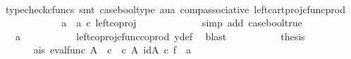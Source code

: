 \begin{isabellebody}
\ \ \ \ \ \ \ \ \ \isamarkupfalse%
\ {\isacharparenleft}{\kern0pt}typecheck{\isacharunderscore}{\kern0pt}cfuncs{\isacharcomma}{\kern0pt}\ smt\ case{\isacharunderscore}{\kern0pt}bool{\isacharunderscore}{\kern0pt}type\ aua\ comp{\isacharunderscore}{\kern0pt}associative{}\ left{\isacharunderscore}{\kern0pt}cart{\isacharunderscore}{\kern0pt}proj{\isacharunderscore}{\kern0pt}cfunc{\isacharunderscore}{\kern0pt}prod{\isacharparenright}{\kern0pt}\isanewline
\ \ \ \ \ \ \ \isamarkupfalse%
\ \isamarkupfalse%
\ {\isachardoublequoteopen}{\isachardot}{\kern0pt}{\isachardot}{\kern0pt}{\isachardot}{\kern0pt}\ {\isacharequal}{\kern0pt}\ {\isacharparenleft}{\kern0pt}a{}\ {\isasymamalg}\ a{}{\isacharparenright}{\kern0pt}\ {\isasymcirc}\isactrlsub c\ left{\isacharunderscore}{\kern0pt}coproj\ {\isasymone}\ {\isasymone}{\isachardoublequoteclose}\isanewline
\ \ \ \ \ \ \ \ \ \isamarkupfalse%
\ {\isacharparenleft}{\kern0pt}simp\ add{\isacharcolon}{\kern0pt}\ case{\isacharunderscore}{\kern0pt}bool{\isacharunderscore}{\kern0pt}true{\isacharparenright}{\kern0pt}\isanewline
\ \ \ \ \ \ \ \isamarkupfalse%
\ \isamarkupfalse%
\ {\isachardoublequoteopen}{\isachardot}{\kern0pt}{\isachardot}{\kern0pt}{\isachardot}{\kern0pt}\ {\isacharequal}{\kern0pt}\ a{}{\isachardoublequoteclose}\isanewline
\ \ \ \ \ \ \ \ \ \isamarkupfalse%
\ left{\isacharunderscore}{\kern0pt}coproj{\isacharunderscore}{\kern0pt}cfunc{\isacharunderscore}{\kern0pt}coprod\ y{\isacharunderscore}{\kern0pt}def\ \isamarkupfalse%
\ blast\isanewline
\ \ \ \ \ \ \ \isamarkupfalse%
\ \isamarkupfalse%
\ {\isacharquery}{\kern0pt}thesis\isacommand{{\isachardot}{\kern0pt}}\isamarkupfalse%
\isanewline
\ \ \ \ \ \isamarkupfalse%
\isanewline
\ \ \ \ \ \isamarkupfalse%
\ a{}{\isacharunderscore}{\kern0pt}is{\isacharcolon}{\kern0pt}\ {\isachardoublequoteopen}{\isacharparenleft}{\kern0pt}eval{\isacharunderscore}{\kern0pt}func\ A\ {\isasymOmega}\ {\isasymcirc}\isactrlsub c\ {\isasymlangle}{\isasymf}\ {\isasymcirc}\isactrlsub c\ {\isasymbeta}\isactrlbsub A\isactrlbsup {\isasymOmega}\isactrlesup \isactrlesub {\isacharcomma}{\kern0pt}\ id{\isacharparenleft}{\kern0pt}A\isactrlbsup {\isasymOmega}\isactrlesup {\isacharparenright}{\kern0pt}{\isasymrangle}{\isacharparenright}{\kern0pt}\ {\isasymcirc}\isactrlsub c\ f\ {\isacharequal}{\kern0pt}\ a{}{\isachardoublequoteclose}\isanewline

\end{isabellebody}
